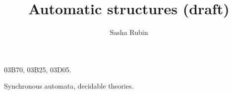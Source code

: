 \documentclass{irmaart}
\newcommand\dateandtime{\today}
\newcommand{\2}{\{0,1\}^\ast}
\begin{document}
\title{Automatic structures (draft)}
\author{Sasha Rubin}
\address{
email:\,\url{sasha.rubin@gmail.com}\\[4mm]
\upshape{\dateandtime}}

\maketitle\label{chapterAS} 

\begin{classification}
03B70, 03B25, 03D05.
\end{classification}

\begin{keywords}
  Synchronous automata, decidable theories.
\end{keywords}




\localtableofcontents



\begin{footnotesize}
  
\end{footnotesize}


\printindex
\end{document}
